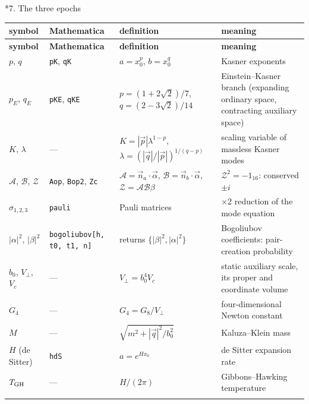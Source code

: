 \documentclass[10pt,a4paper]{article}
\makeatletter
\renewcommand\section{\@startsection{section}{1}{\z@}{-3.5ex \@plus -1ex \@minus -.2ex}{2.3ex \@plus.2ex}{\normalfont\Large\bfseries\raggedright}}
\makeatother
\begin{document}
\section*{7. The three epochs}
{\small
\begin{longtable}{>{\raggedright\arraybackslash}p{}>{\raggedright\arraybackslash}p{}>{\raggedright\arraybackslash}p{}>{\raggedright\arraybackslash}p{}}
\toprule
\textbf{symbol} & \textbf{Mathematica} & \textbf{definition} & \textbf{meaning} \\
\midrule\endfirsthead
\toprule
\textbf{symbol} & \textbf{Mathematica} & \textbf{definition} & \textbf{meaning} \\
\midrule\endhead
\endfoot
\bottomrule\endlastfoot
$p$, $q$ & \texttt{pK}, \texttt{qK} & $a=x_0^p$, $b=x_0^q$ & Kasner exponents \\
$p_E$, $q_E$ & \texttt{pKE}, \texttt{qKE} & $p=(1+2\sqrt2)/7$, $q=(2-3\sqrt2)/14$ & Einstein–Kasner branch (expanding ordinary space, contracting auxiliary space) \\
$K$, $\lambda$ & — & $K=|\vec p|\lambda^{1-p}$, $\lambda=(|\vec q|/|\vec p|)^{1/(q-p)}$ & scaling variable of massless Kasner modes \\
$\mathcal A$, $\mathcal B$, $\mathcal Z$ & \texttt{Aop}, \texttt{Bop2}, \texttt{Zc} & $\mathcal A=\vec n_a\cdot\vec\alpha$, $\mathcal B=\vec n_b\cdot\vec\alpha$, $\mathcal Z=\mathcal A\mathcal B\beta$ & $\mathcal Z^2=-1_{16}$: conserved $\pm i$ \\
$\sigma_{1,2,3}$ & \texttt{pauli} & Pauli matrices & 2×2 reduction of the mode equation \\
$|\alpha|^2$, $|\beta|^2$ & \texttt{bogoliubov[h, t0, t1, n]} & returns $\lbrace|\beta|^2,|\alpha|^2\rbrace$ & Bogoliubov coefficients: pair-creation probability \\
$b_0$, $V_\perp$, $V_c$ & — & $V_\perp=b_0^4V_c$ & static auxiliary scale, its proper and coordinate volume \\
$G_4$ & — & $G_4=G_8/V_\perp$ & four-dimensional Newton constant \\
$M$ & — & $\sqrt{m^2+|\vec q|^2/b_0^2}$ & Kaluza–Klein mass \\
$H$ (de Sitter) & \texttt{hdS} & $a=e^{Hx_0}$ & de Sitter expansion rate \\
$T_{\rm GH}$ & — & $H/(2\pi)$ & Gibbons–Hawking temperature \\*
\end{longtable}}
\end{document}
